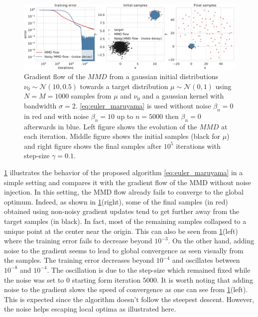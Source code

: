 \begin{figure}[ht]
	\centering
	\includegraphics[width=0.8\linewidth]{figures/Gaussians_error_4}
	\caption{Gradient flow of the $MMD$ from a gaussian initial distributions $\nu_0\sim \mathcal{N}(10,0.5)$  towards a target distribution $\mu\sim \mathcal{N}(0,1)$ using $N=M=1000$ samples from $\mu$ and $\nu_0$ and a gaussian kernel with bandwidth $\sigma = 2 $. \cref{eq:euler_maruyama} is used 
	without noise $\beta_n = 0$ in red and  with noise $\beta_n = 10$ up to $n=5000$ then $\beta_n = 0$ afterwards in blue. 
	Left figure shows the evolution of the $MMD$ at each iteration. Middle figure shows the initial samples (black for $\mu$) and right figure shows the final samples after $10^5$ iterations with step-size $\gamma = 0.1$.}
	\label{fig:experiments}
\end{figure}
\cref{fig:experiments} illustrates the behavior of the proposed algorithm \cref{eq:euler_maruyama} in a simple setting and compares it with the gradient flow of the MMD without noise injection. In this setting, the MMD flow already fails to converge to the global optimum. Indeed, as shown in \cref{fig:experiments}(right), some of the final samples (in red) obtained using non-noisy gradient updates tend to get further away from the target samples (in black). In fact, most of the remaining samples collapsed to a unique point at the center near the origin. This can also be seen from \cref{fig:experiments}(left) where the training error fails to decrease beyond $10^{-3}$. On the other hand, adding noise to the gradient seems to lead to global convergence as seen visually from the samples. The training error decreases beyond $10^{-4}$ and oscillates between $10^{-8}$ and $10^{-4}$. The oscillation is due to the step-size which remained fixed while the noise was set to $0$ starting form iteration $5000$. It is worth noting that adding noise to the gradient slows the speed of convergence as one can see from \cref{fig:experiments}(left). This is expected since the algorithm doesn't follow the steepest descent. However, the noise helps escaping local optima as  illustrated here.
